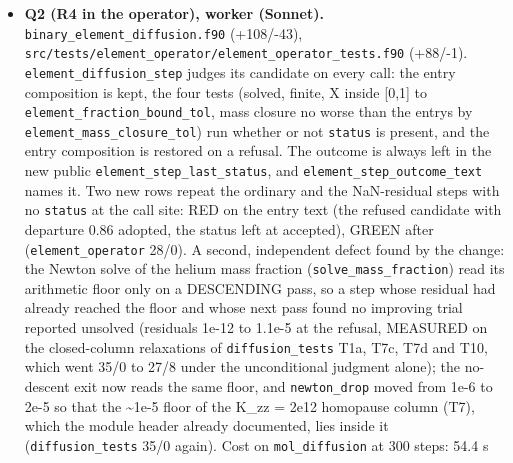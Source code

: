 \documentclass[english,a4paper]{my_memo}
\begin{document}
\begin{itemize}
\begin{itemize}
    contract (\texttt{EXHALE\_CARRIER\_TRUST=1e6}, cap 40) reaches the fixed wind\textquotesingle s
    fixed point in 61 transport steps at drift 0.995 with the H2 front
    (x2 = 0.5) at 3.079 R\_p (P21: 57 steps, 2.237 R\_p; both fully molecular
    fixed points, the front leaving the domain). The 12-pass production loop
    ends at H2 row 5.49e-2 at cell 279, front 1.0755 R\_p (the 110-pass ladder
    of P16 at pass 12: 5.50e-2 at cell 279, 1.0765 R\_p); no pass triggered
    the halving. \texttt{atomic\_elem\_newton} at three passes: pass lines identical to
    the control build. \texttt{wasp\_full\_newton} reload and the \texttt{mol\_carrier} case
    (12000 steps, one thread): data rows identical to the control build and
    to the golden.
  \end{itemize}
\item
  \textbf{Q2 (R4 in the operator), worker (Sonnet).}
  \texttt{binary\_element\_diffusion.f90} (+108/-43),
  \texttt{src/tests/element\_operator/element\_operator\_tests.f90} (+88/-1).
  \texttt{element\_diffusion\_step} judges its candidate on every call: the entry
  composition is kept, the four tests (solved, finite, X inside {[}0,1{]} to
  \texttt{element\_fraction\_bound\_tol}, mass closure no worse than the entry\textquotesingle s by
  \texttt{element\_mass\_closure\_tol}) run whether or not \texttt{status} is present, and the
  entry composition is restored on a refusal. The outcome is always left in
  the new public \texttt{element\_step\_last\_status}, and \texttt{element\_step\_outcome\_text}
  names it. Two new rows repeat the ordinary and the NaN-residual steps with
  no \texttt{status} at the call site: RED on the entry text (the refused candidate
  with departure 0.86 adopted, the status left at accepted), GREEN after
  (\texttt{element\_operator} 28/0). A second, independent defect found by the change:
  the Newton solve of the helium mass fraction (\texttt{solve\_mass\_fraction}) read
  its arithmetic floor only on a DESCENDING pass, so a step whose residual had
  already reached the floor and whose next pass found no improving trial
  reported unsolved (residuals 1e-12 to 1.1e-5 at the refusal, MEASURED on
  the closed-column relaxations of \texttt{diffusion\_tests} T1a, T7c, T7d and T10,
  which went 35/0 to 27/8 under the unconditional judgment alone); the
  no-descent exit now reads the same floor, and \texttt{newton\_drop} moved from
  1e-6 to 2e-5 so that the \textasciitilde1e-5 floor of the K\_zz = 2e12 homopause column
  (T7), which the module header already documented, lies inside it
  (\texttt{diffusion\_tests} 35/0 again). Cost on \texttt{mol\_diffusion} at 300 steps: 54.4 s

\end{itemize}
\end{document}

